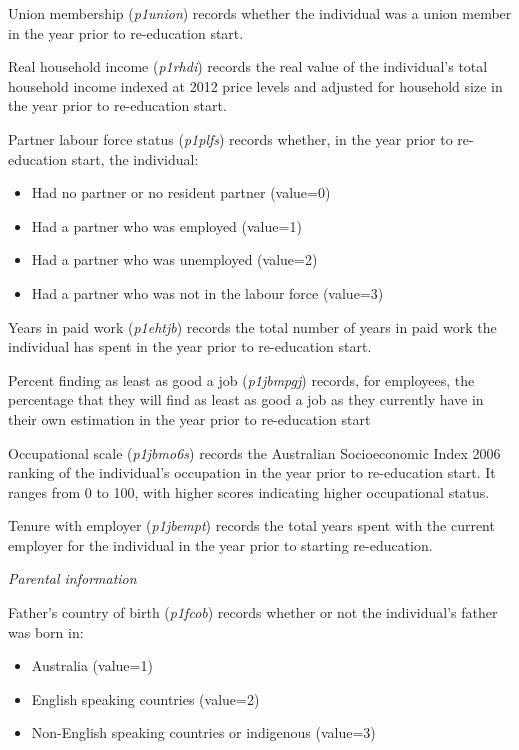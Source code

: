 \documentclass[12pt, a4paper]{article}
\begin{document}
Union membership (\textit{p1\textunderscore{}union}) records whether the individual was a union member in the year prior to re-education start.

Real household income (\textit{p1\textunderscore{}rhdi}) records the real value of the individual’s total household income indexed at 2012 price levels and adjusted for household size in the year prior to re-education start.

Partner labour force status (\textit{p1\textunderscore{}plfs}) records whether, in the year prior to re-education start, the individual:
\begin{itemize}
  \item Had no partner or no resident partner (value=0)
  \item Had a partner who was employed (value=1)
  \item Had a partner who was unemployed (value=2)
  \item Had a partner who was not in the labour force (value=3)
\end{itemize}  

Years in paid work (\textit{p1\textunderscore{}ehtjb})  records the total number of years in paid work the individual has spent in the year prior to re-education start.

Percent finding as least as good a job (\textit{p1\textunderscore{}jbmpgj})  records, for employees, the percentage that they will find as least as good a job as they currently have in their own estimation in the year prior to re-education start

Occupational scale (\textit{p1\textunderscore{}jbmo6s}) records the Australian Socioeconomic Index 2006 ranking of the individual’s occupation in the year prior to re-education start. It ranges from 0 to 100, with higher scores indicating higher occupational status. 

Tenure with employer (\textit{p1\textunderscore{}jbempt}) records the total years spent with the current employer for the individual in the year prior to starting re-education.

\emph{Parental information}

Father’s country of birth (\textit{p1\textunderscore{}fcob}) records whether or not the individual’s father was born in:
\begin{itemize}
  \item Australia (value=1) 
  \item English speaking countries (value=2)
  \item Non-English speaking countries or indigenous (value=3)
\end{itemize}  
\end{document}
